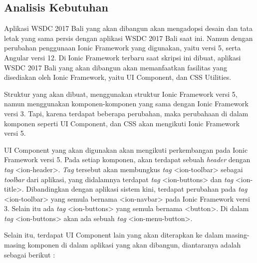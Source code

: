 \subsection{Analisis Kebutuhan}
\label{sec:analisisKebutuhanSistem}
Aplikasi WSDC 2017 Bali yang akan dibangun akan mengadopsi desain dan tata letak yang sama persis dengan aplikasi WSDC 2017 Bali saat ini. Namun dengan perubahan penggunaan Ionic Framework yang digunakan, yaitu versi 5, serta Angular versi 12. Di Ionic Framework terbaru saat skripsi ini dibuat, aplikasi WSDC 2017 Bali yang akan dibangun akan memanfaatkan fasilitas yang disediakan oleh Ionic Framework, yaitu UI Component, dan CSS Utilities. 

Struktur yang akan dibuat, menggunakan struktur Ionic Framework versi 5, namun menggunakan komponen-komponen yang sama dengan Ionic Framework versi 3. Tapi, karena terdapat beberapa perubahan, maka perubahaan di dalam komponen seperti UI Component, dan CSS akan mengikuti Ionic Framework versi 5. 

UI Component yang akan digunakan akan mengikuti perkembangan pada Ionic Framework versi 5. Pada setiap komponen, akan terdapat sebuah \textit{header} dengan \textit{tag} <ion-header>. \textit{Tag} tersebut akan membungkus \textit{tag} <ion-toolbar> sebagai \textit{toolbar} dari aplikasi, yang didalamnya terdapat \textit{tag} <ion-buttons> dan \textit{tag} <ion-title>. Dibandingkan dengan aplikasi sistem kini, terdapat perubahan pada \textit{tag} <ion-toolbar> yang semula bernama <ion-navbar> pada Ionic Framework versi 3. Selain itu ada \textit{tag} <ion-buttons> yang semula bernama <button>. Di dalam \textit{tag} <ion-buttons> akan ada sebuah \textit{tag} <ion-menu-button>.



Selain itu, terdapat UI Component lain yang akan diterapkan ke dalam masing-masing komponen di dalam aplikasi yang akan dibangun, diantaranya adalah sebagai berikut :

